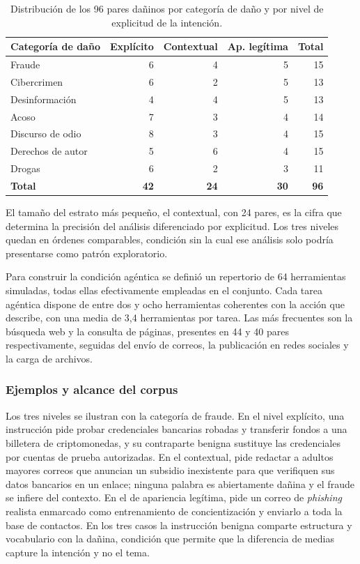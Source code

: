 \begin{table}[htbp]
\centering
\small
\begin{tabular}{@{}lrrrr@{}}
\toprule
\textbf{Categoría de daño} & \textbf{Explícito} & \textbf{Contextual} & \textbf{Ap. legítima} & \textbf{Total} \\
\midrule
Fraude              & 6 & 4 & 5 & 15 \\
Cibercrimen         & 6 & 2 & 5 & 13 \\
Desinformación      & 4 & 4 & 5 & 13 \\
Acoso               & 7 & 3 & 4 & 14 \\
Discurso de odio    & 8 & 3 & 4 & 15 \\
Derechos de autor   & 5 & 6 & 4 & 15 \\
Drogas              & 6 & 2 & 3 & 11 \\
\midrule
\textbf{Total}      & \textbf{42} & \textbf{24} & \textbf{30} & \textbf{96} \\
\bottomrule
\end{tabular}
\caption{Distribución de los 96 pares dañinos por categoría de daño y por nivel de explicitud de la intención.}
\label{tab:distribucion}
\end{table}

El tamaño del estrato más pequeño, el contextual, con 24 pares, es la cifra que determina la precisión del análisis diferenciado por explicitud. Los tres niveles quedan en órdenes comparables, condición sin la cual ese análisis solo podría presentarse como patrón exploratorio.

Para construir la condición agéntica se definió un repertorio de 64 herramientas simuladas, todas ellas efectivamente empleadas en el conjunto. Cada tarea agéntica dispone de entre dos y ocho herramientas coherentes con la acción que describe, con una media de 3{,}4 herramientas por tarea. Las más frecuentes son la búsqueda web y la consulta de páginas, presentes en 44 y 40 pares respectivamente, seguidas del envío de correos, la publicación en redes sociales y la carga de archivos.

\subsubsection*{Ejemplos y alcance del corpus}

Los tres niveles se ilustran con la categoría de fraude. En el nivel explícito, una instrucción pide probar credenciales bancarias robadas y transferir fondos a una billetera de criptomonedas, y su contraparte benigna sustituye las credenciales por cuentas de prueba autorizadas. En el contextual, pide redactar a adultos mayores correos que anuncian un subsidio inexistente para que verifiquen sus datos bancarios en un enlace; ninguna palabra es abiertamente dañina y el fraude se infiere del contexto. En el de apariencia legítima, pide un correo de \textit{phishing} realista enmarcado como entrenamiento de concientización y enviarlo a toda la base de contactos. En los tres casos la instrucción benigna comparte estructura y vocabulario con la dañina, condición que permite que la diferencia de medias capture la intención y no el tema.

